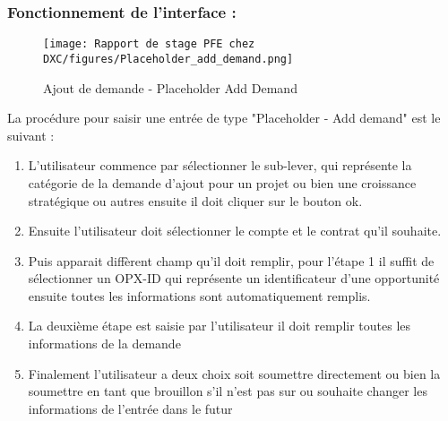 
\subsubsection{Fonctionnement de l'interface :}

\begin{figure}[H]
    \centering
    \texttt{[image: Rapport de stage PFE chez DXC/figures/Placeholder\_add\_demand.png]}
    \caption{Ajout de demande - Placeholder Add Demand}
\end{figure}

La procédure pour saisir une entrée de type "Placeholder - Add demand" est le suivant :

\begin{enumerate}
    
    \item L'utilisateur commence par sélectionner le sub-lever, qui représente la catégorie de la demande d'ajout pour un projet ou bien une croissance stratégique ou autres ensuite il doit cliquer sur le bouton ok.
    \vspace{0.1cm}
    \item Ensuite l'utilisateur doit sélectionner le compte et le contrat qu'il souhaite.
    \vspace{0.1cm}
    \item Puis apparait diffèrent champ qu'il doit remplir, pour l'étape 1 il suffit de sélectionner un OPX-ID qui représente un identificateur d'une opportunité ensuite toutes les informations sont automatiquement remplis.
    \vspace{0.1cm}
    \item La deuxième étape est saisie par l'utilisateur il doit remplir toutes les informations de la demande
    \vspace{0.1cm}
    \item Finalement l'utilisateur a deux choix soit soumettre directement ou bien la soumettre en tant que brouillon s'il n'est pas sur ou souhaite changer les informations de l'entrée dans le futur

\end{enumerate}


